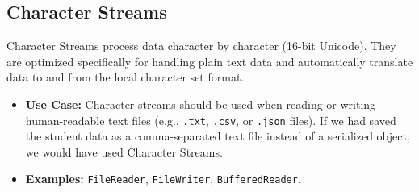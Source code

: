 \documentclass[12pt, a4paper]{article}
\begin{document}
    \subsection*{Character Streams}                                                                                                                                        
    Character Streams process data character by character (16-bit Unicode). They are optimized specifically for handling plain text data and automatically translate data  
  to and from the local character set format.                                                                                                                              
    \begin{itemize}                                                                                                                                                        
        \item \textbf{Use Case:} Character streams should be used when reading or writing human-readable text files (e.g., \texttt{.txt}, \texttt{.csv}, or \texttt{.json} 
  files). If we had saved the student data as a comma-separated text file instead of a serialized object, we would have used Character Streams.                            
        \item \textbf{Examples:} \texttt{FileReader}, \texttt{FileWriter}, \texttt{BufferedReader}.                                                                        
    \end{itemize}                                                                                                                                                          
                                                                                                                                                                           
    
\end{document}
